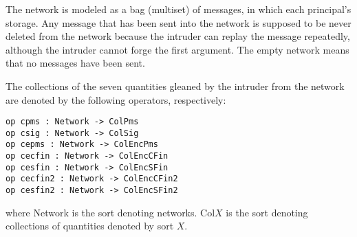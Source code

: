 \documentclass[a4paper,fleqn]{cas-dc}
\begin{document}



The  network  is  modeled  as  a  bag (multiset)  of  messages,  in which each principal’s storage. Any message that has been sent into the network is supposed to be never deleted from the network because the intruder can replay the message repeatedly, although the intruder cannot forge the first argument. The empty network means that no messages have been sent.


The collections of the seven quantities gleaned by the intruder from the network are denoted by the following operators, respectively:
\begin{small}
\begin{verbatim}
op cpms : Network -> ColPms
op csig : Network -> ColSig
op cepms : Network -> ColEncPms
op cecfin : Network -> ColEncCFin
op cesfin : Network -> ColEncSFin
op cecfin2 : Network -> ColEncCFin2
op cesfin2 : Network -> ColEncSFin2
\end{verbatim}
\end{small}	
where Network is the sort denoting networks. Col$X$ is
the sort denoting collections of quantities denoted
by sort $X$.
\end{document}
